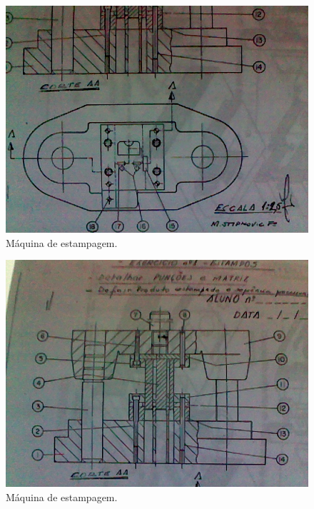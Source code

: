 \documentclass[a4paper, 12pt]{article}
\begin{document}
\begin{figure}[h]
\begin{center}
\includegraphics[scale=0.45]{./fig/111108-220046.jpg}
\caption{\label{fig:2}Máquina de estampagem.} 
\end{center}
\end{figure}

\begin{figure}[h]
\begin{center}
\includegraphics[scale=0.50]{./fig/111108-220105.jpg}
\caption{\label{fig:2}Máquina de estampagem.} 
\end{center}
\end{figure}
\end{document}
